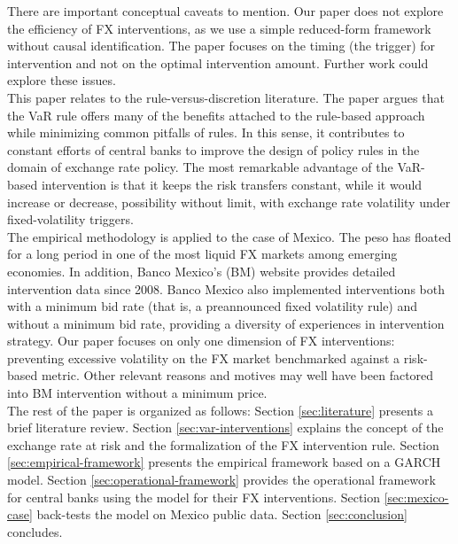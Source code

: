 \documentclass[11pt]{article}
\begin{document}
There are important conceptual caveats to  mention. Our paper does not explore
the efficiency of FX interventions, as  we use a simple reduced-form framework
without causal identification.  The paper  focuses on the timing (the trigger)
for intervention  and not  on the optimal  intervention amount.   Further work
could explore these issues.\\

This paper relates to the  rule-versus-discretion literature. The paper argues
that  the VaR  rule offers  many of  the benefits  attached to  the rule-based
approach  while  minimizing common  pitfalls  of  rules.   In this  sense,  it
contributes to  constant efforts  of central  banks to  improve the  design of
policy rules  \citep{taylor2017} in the  domain of exchange rate  policy.  The
most remarkable advantage  of the VaR-based intervention is that  it keeps the
risk  transfers constant,  while it  would increase  or decrease,  possibility
without   limit,  with   exchange  rate   volatility  under   fixed-volatility
triggers.\\

The  empirical methodology  is applied  to the  case of  Mexico. The  peso has
floated for a long period in one  of the most liquid FX markets among emerging
economies.  In  addition,  Banco   Mexico's  (BM)  website  provides  detailed
intervention data since 2008. Banco Mexico also implemented interventions both
with a  minimum bid rate (that  is, a preannounced fixed  volatility rule) and
without  a  minimum  bid  rate,   providing  a  diversity  of  experiences  in
intervention  strategy.  Our  paper  focuses  on  only  one  dimension  of  FX
interventions: preventing  excessive volatility  on the FX  market benchmarked
against a risk-based metric. Other relevant  reasons and motives may well have
been factored into BM intervention without a minimum price.\\

The rest  of the paper  is organized as follows:  Section \ref{sec:literature}
presents  a  brief  literature  review.   Section  \ref{sec:var-interventions}
explains the concept of the exchange rate at risk and the formalization of the
FX  intervention  rule.   Section \ref{sec:empirical-framework}  presents  the
empirical     framework    based     on     a     GARCH    model.      Section
\ref{sec:operational-framework} provides the operational framework for central
banks    using   the    model    for   their    FX   interventions.    Section
\ref{sec:mexico-case}  back-tests the  model  on Mexico  public data.  Section
\ref{sec:conclusion} concludes.\\
\end{document}
